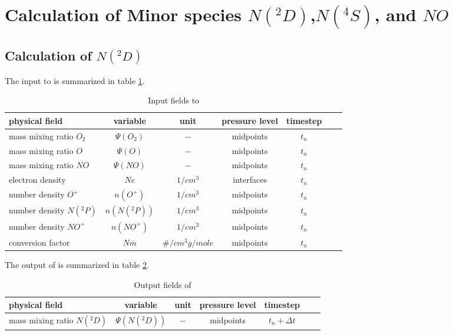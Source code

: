 %
\section{Calculation of Minor species $N(^2D)$,$N(^4S)$, and $NO$    }\label{cap:comp_n}
%
\subsection{Calculation of $N(^2D)$}\label{subcap:comp_n2d}
%
The input to  is summarized in table
\ref{tab:input_comp_n2d}.
%
\begin{table}[tb]
\begin{tabular}{|p{3.5cm} ||c|c|c|c|c|c|} \hline
physical field               & variable        & unit&pressure
level& timestep
\\ \hline \hline
%
mass mixing ratio $O_2$ &       $\Psi(O_2)$              & $-$   &  midpoints & $t_n$\\
mass mixing ratio $O$ &         $\Psi(O  )$              & $-$   &  midpoints & $t_n$\\
mass mixing ratio $NO$ &       $\Psi(NO)$              & $-$   &  midpoints & $t_n$\\
electron density&       $Ne$              & $1/cm^3$   &  interfaces & $t_n$\\
number density $O^+$&       $n(O^+)$              & $1/cm^3$   &  midpoints & $t_n$\\
number density $N(^2P)$&       $n(N(^2P))$              & $1/cm^3$   &  midpoints & $t_n$\\
number density $NO^+$&       $n(NO^+)$              & $1/cm^3$   &  midpoints & $t_n$\\
conversion factor&       $N \overline{m}$              & $\#/cm^3
g/mole$   &  midpoints & $t_n$
 \\ \hline
\end{tabular}
\caption{Input fields to }
\label{tab:input_comp_n2d}
\end{table}
%
The output of  is summarized in table
\ref{tab:output_comp_n2d}.
%
\begin{table}[tb]
\begin{tabular}{|p{3.5cm} ||c|c|c|c|c|c|} \hline
physical field               & variable        & unit&pressure
level& timestep \\ \hline \hline mass mixing ratio $N(^2D)$ &
$\Psi(N(^2D))$ & $-$ & midpoints & $t_n+\Delta t$
\\ \hline \hline
\end{tabular}
\caption{Output fields of }
\label{tab:output_comp_n2d}
\end{table}
